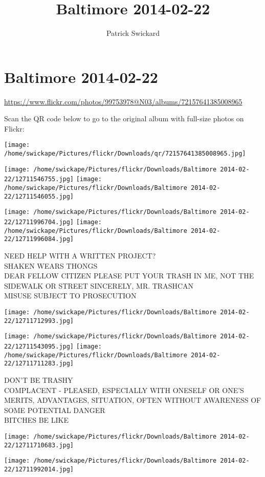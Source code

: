 \documentclass[10pt,letterpaper]{article}
\title{Baltimore 2014-02-22}
\author{Patrick Swickard}
\date{}
\begin{document}
\section*{Baltimore 2014-02-22}

\url{https://www.flickr.com/photos/99753978@N03/albums/72157641385008965}

Scan the QR code below to go to the original album with full-size photos on Flickr:

\texttt{[image: /home/swickape/Pictures/flickr/Downloads/qr/72157641385008965.jpg]}
\pagebreak

\texttt{[image: /home/swickape/Pictures/flickr/Downloads/Baltimore 2014-02-22/12711546755.jpg]}
\texttt{[image: /home/swickape/Pictures/flickr/Downloads/Baltimore 2014-02-22/12711546055.jpg]}

\texttt{[image: /home/swickape/Pictures/flickr/Downloads/Baltimore 2014-02-22/12711996704.jpg]}
\texttt{[image: /home/swickape/Pictures/flickr/Downloads/Baltimore 2014-02-22/12711996084.jpg]}

NEED HELP WITH A WRITTEN PROJECT?\\
SHAKEN WEARS THONGS\\
DEAR FELLOW CITIZEN PLEASE PUT YOUR TRASH IN ME, NOT THE SIDEWALK OR STREET SINCERELY, MR. TRASHCAN\\
MISUSE SUBJECT TO PROSECUTION
\pagebreak

\texttt{[image: /home/swickape/Pictures/flickr/Downloads/Baltimore 2014-02-22/12711712993.jpg]}

\vspace{0.25in}
\texttt{[image: /home/swickape/Pictures/flickr/Downloads/Baltimore 2014-02-22/12711543095.jpg]}
\texttt{[image: /home/swickape/Pictures/flickr/Downloads/Baltimore 2014-02-22/12711711283.jpg]}

DON'T BE TRASHY\\
COMPLACENT {-} PLEASED, ESPECIALLY WITH ONESELF OR ONE'S MERITS, ADVANTAGES, SITUATION, OFTEN WITHOUT AWARENESS OF SOME POTENTIAL DANGER\\
BITCHES BE LIKE
\pagebreak

\texttt{[image: /home/swickape/Pictures/flickr/Downloads/Baltimore 2014-02-22/12711710683.jpg]}

\vspace{0.25in}
\texttt{[image: /home/swickape/Pictures/flickr/Downloads/Baltimore 2014-02-22/12711992014.jpg]}
\end{document}
